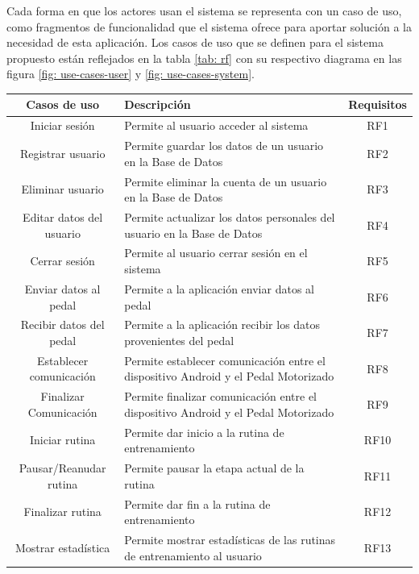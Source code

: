 Cada forma en que los actores usan el sistema se representa con un caso de uso, como fragmentos de funcionalidad que el sistema ofrece para aportar solución a la necesidad de esta aplicación. Los casos de uso que se definen para el sistema propuesto están reflejados en la tabla \ref{tab: rf} con su respectivo diagrama en las figura \ref{fig: use-cases-user} y \ref{fig: use-cases-system}.
\begin{table}[ht]
    \centering
    \begin{tabularx}{\textwidth}{|c|X|c|}
        \hline
        \textbf{Casos de uso} & \textbf{Descripción} & \textbf{Requisitos}\\\hline
        Iniciar sesión & Permite al usuario acceder al sistema & RF1\\\hline
        Registrar usuario & Permite guardar los datos de un usuario en la Base de Datos & RF2\\\hline
        Eliminar usuario & Permite eliminar la cuenta de un usuario en la Base de Datos & RF3\\\hline
        Editar datos del usuario & Permite actualizar los datos personales del usuario en la Base de Datos & RF4\\\hline
        Cerrar sesión & Permite al usuario cerrar sesión en el sistema & RF5\\\hline
        Enviar datos al pedal & Permite a la aplicación enviar datos al pedal & RF6 \\\hline
        Recibir datos del pedal & Permite a la aplicación recibir los datos provenientes del pedal & RF7\\\hline
        Establecer comunicación & Permite establecer comunicación entre el dispositivo Android y el Pedal Motorizado & RF8\\\hline
        Finalizar Comunicación & Permite finalizar comunicación entre el dispositivo Android y el Pedal Motorizado & RF9\\\hline
        Iniciar rutina & Permite dar inicio a la rutina de entrenamiento & RF10\\\hline
        Pausar/Reanudar rutina & Permite pausar la etapa actual de la rutina & RF11\\\hline
        Finalizar rutina & Permite dar fin a la rutina de entrenamiento & RF12\\\hline
        Mostrar estadística & Permite mostrar estadísticas de las rutinas de entrenamiento  al usuario& RF13\\\hline

\end{tabularx}
\end{table}
